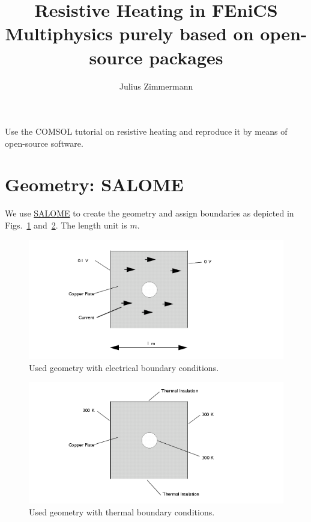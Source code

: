 \documentclass{article}
\title{Resistive Heating in FEniCS\\ \small 
Multiphysics purely based on open-source packages}
\author{Julius Zimmermann}
\begin{document}
\maketitle 
Use the COMSOL tutorial on resistive heating and reproduce it by means of open-source software. 
\section{Geometry: SALOME}
\label{Sec:Geo}
We use \href{http://www.salome-platform.org/}{SALOME} to create the geometry and assign boundaries as depicted in Figs.~\ref{Fig:Geo} and~\ref{Fig:GeoThe}.
The length unit is $\si{m}$.

\begin{figure}[htp]
	 \includegraphics[width=\textwidth]{geometry}
	\caption{Used geometry with electrical boundary conditions.}
		\label{Fig:Geo}
\end{figure}
\begin{figure}[htp]
	 \includegraphics[width=\textwidth]{geometrythermal}
	\caption{Used geometry with thermal boundary conditions.}
		\label{Fig:GeoThe}
\end{figure}
\end{document}
